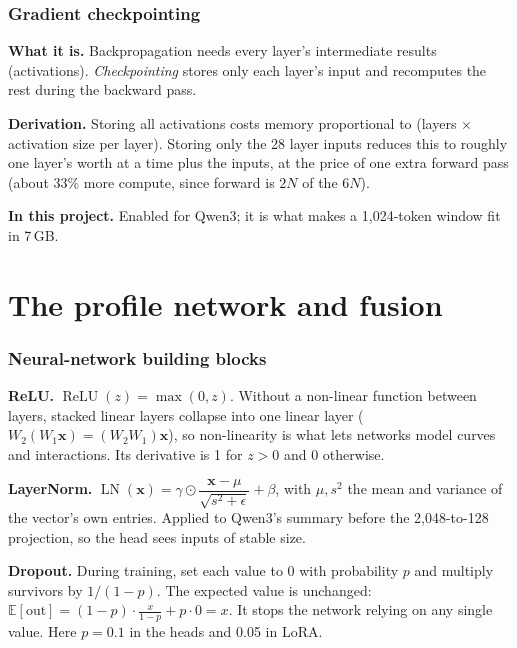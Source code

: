 \documentclass[10pt,a4paper]{article}
\newcommand{\what}[1]{\par\textbf{What it is.} #1}
\newcommand{\here}[1]{\par\textbf{In this project.} #1}
\newcommand{\deriv}{\par\textbf{Derivation.} }
\begin{document}
\section{Gradient checkpointing}
\what{Backpropagation needs every layer's intermediate results (activations). \emph{Checkpointing} stores only each layer's input and recomputes the rest during the backward pass.}
\deriv Storing all activations costs memory proportional to (layers $\times$ activation size per layer). Storing only the 28 layer inputs reduces this to roughly one layer's worth at a time plus the inputs, at the price of one extra forward pass (about 33\% more compute, since forward is $2N$ of the $6N$).
\here{Enabled for Qwen3; it is what makes a 1,024-token window fit in 7\,GB.}

\part{The profile network and fusion}
\section{Neural-network building blocks}
\textbf{ReLU.} $\operatorname{ReLU}(z)=\max(0,z)$. Without a non-linear function between layers, stacked linear layers collapse into one linear layer ($W_2(W_1\mathbf{x})=(W_2W_1)\mathbf{x}$), so non-linearity is what lets networks model curves and interactions. Its derivative is 1 for $z>0$ and 0 otherwise.

\textbf{LayerNorm.} $\operatorname{LN}(\mathbf{x})=\gamma\odot\dfrac{\mathbf{x}-\mu}{\sqrt{s^2+\epsilon}}+\beta$, with $\mu,s^2$ the mean and variance of the vector's own entries. Applied to Qwen3's summary before the 2,048-to-128 projection, so the head sees inputs of stable size.

\textbf{Dropout.} During training, set each value to 0 with probability $p$ and multiply survivors by $1/(1-p)$. The expected value is unchanged: $\mathbb{E}[\text{out}]=(1-p)\cdot\frac{x}{1-p}+p\cdot0=x$. It stops the network relying on any single value. Here $p=0.1$ in the heads and 0.05 in LoRA.
\end{document}
